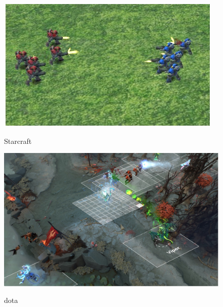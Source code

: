 \documentclass[notheorems, aspectratio=54]{beamer}
\begin{document}
\begin{frame}
\begin{figure}[h]
\begin{minipage}{0.45\textwidth}
    \includegraphics[width=\textwidth]{ starcraft.png}
    \begin{center}
    Starcraft
    \end{center}
  \end{minipage}
  \hspace{0.02\linewidth}
  \begin{minipage}{0.45\textwidth}
    \includegraphics[width=\textwidth]{ dota.png}
    \begin{center}
    dota 
    \end{center}
  \end{minipage}
  \end{figure}
  \vfill
  
\end{frame}
\end{document}
